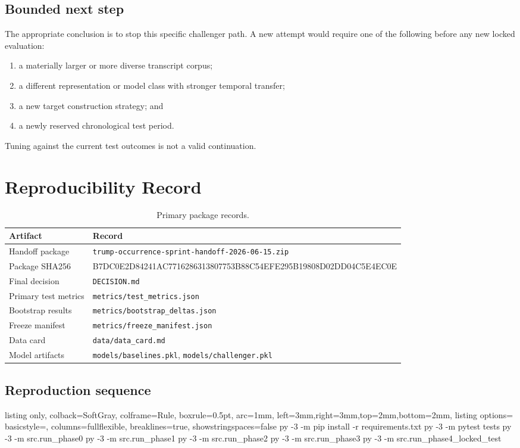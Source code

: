 \documentclass[10pt,a4paper]{article}
\newcommand{\code}[1]{\texttt{\small #1}}
\newcommand{\PackageHash}{B7DC0E2D84241AC7716286313807753B88C54EFE295B19808D02DD04C5E4EC0E}
\begin{document}
\subsection{Bounded next step}
The appropriate conclusion is to stop this specific challenger path. A new attempt
would require one of the following before any new locked evaluation:
\begin{enumerate}
  \item a materially larger or more diverse transcript corpus;
  \item a different representation or model class with stronger temporal transfer;
  \item a new target construction strategy; and
  \item a newly reserved chronological test period.
\end{enumerate}
Tuning against the current test outcomes is not a valid continuation.

\section{Reproducibility Record}

\begin{table}[H]
  \centering
  \caption{Primary package records.}
  \begin{tabularx}{\textwidth}{@{}L{43mm}Y@{}}
    \toprule
    \textbf{Artifact} & \textbf{Record}\\
    \midrule
    Handoff package &
      \code{trump-occurrence-sprint-handoff-2026-06-15.zip}\\
    Package SHA256 &
      \begingroup\ttfamily\footnotesize\PackageHash\endgroup\\
    Final decision &
      \code{DECISION.md}\\
    Primary test metrics &
      \code{metrics/test\_metrics.json}\\
    Bootstrap results &
      \code{metrics/bootstrap\_deltas.json}\\
    Freeze manifest &
      \code{metrics/freeze\_manifest.json}\\
    Data card &
      \code{data/data\_card.md}\\
    Model artifacts &
      \code{models/baselines.pkl}, \code{models/challenger.pkl}\\
    \bottomrule
  \end{tabularx}
\end{table}

\subsection{Reproduction sequence}
\begin{tcblisting}{
  listing only,
  colback=SoftGray,
  colframe=Rule,
  boxrule=0.5pt,
  arc=1mm,
  left=3mm,right=3mm,top=2mm,bottom=2mm,
  listing options={
    basicstyle=\ttfamily\small,
    columns=fullflexible,
    breaklines=true,
    showstringspaces=false
  }
}
py -3 -m pip install -r requirements.txt
py -3 -m pytest tests
py -3 -m src.run_phase0
py -3 -m src.run_phase1
py -3 -m src.run_phase2
py -3 -m src.run_phase3
py -3 -m src.run_phase4_locked_test
\end{tcblisting}
\end{document}
